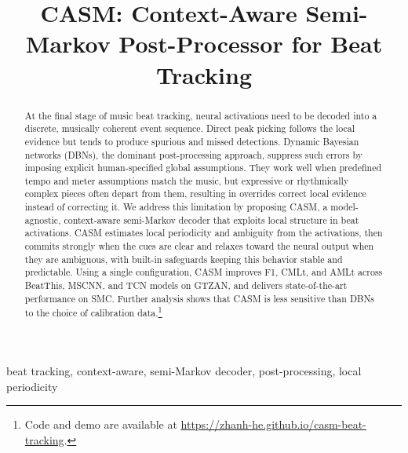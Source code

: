 \documentclass{article}
\title{CASM: Context-Aware Semi-Markov Post-Processor for Beat Tracking}
\begin{document}
\ninept
\maketitle

\begin{abstract}
At the final stage of music beat tracking, neural activations need to be decoded into a discrete, musically coherent event sequence. Direct peak picking follows the local evidence but tends to produce spurious and missed detections. Dynamic Bayesian networks (DBNs), the dominant post-processing approach, suppress such errors by imposing explicit human-specified global assumptions. They work well when predefined tempo and meter assumptions match the music, but expressive or rhythmically complex pieces often depart from them, resulting in overrides correct local evidence instead of correcting it. We address this limitation by proposing CASM, a model-agnostic, context-aware semi-Markov decoder that exploits local structure in beat activations. CASM estimates local periodicity and ambiguity from the activations, then commits strongly when the cues are clear and relaxes toward the neural output when they are ambiguous, with built-in safeguards keeping this behavior stable and predictable. Using a single configuration, CASM improves F1, CMLt, and AMLt across BeatThis, MSCNN, and TCN models on GTZAN, and delivers state-of-the-art performance on SMC. Further analysis shows that CASM is less sensitive than DBNs to the choice of calibration data.\footnote{Code and demo are available at \url{https://zhanh-he.github.io/casm-beat-tracking}.}
\end{abstract}

\begin{keywords}
beat tracking, context-aware, semi-Markov decoder, post-processing, local periodicity
\end{keywords}
\end{document}
